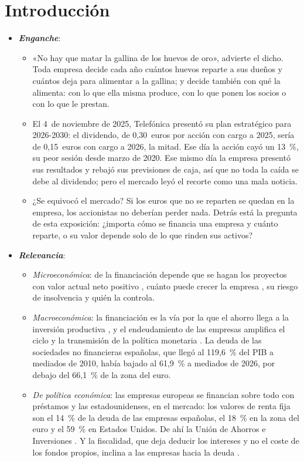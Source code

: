 \documentclass[11pt]{article}
\begin{document}
\tceetitulo

\section*{Introducción}

\begin{itemize}
\item \textbf{\emph{Enganche}}:
  \begin{itemize}
  \item «No hay que matar la gallina de los huevos de oro», advierte el dicho. Toda empresa decide cada año cuántos huevos reparte a sus dueños y cuántos deja para alimentar a la gallina; y decide también con qué la alimenta: con lo que ella misma produce, con lo que ponen los socios o con lo que le prestan.
  \item El 4~de noviembre de 2025, Telefónica presentó su plan estratégico para 2026-2030: el dividendo, de 0,30~euros por acción con cargo a 2025, sería de 0,15~euros con cargo a 2026, la mitad\nocite{Telefonica2025Plan}. Ese día la acción cayó un 13~\%, su peor sesión desde marzo de 2020\nocite{EuropaPress2025Telefonica}. Ese mismo día la empresa presentó sus resultados y rebajó sus previsiones de caja, así que no toda la caída se debe al dividendo; pero el mercado leyó el recorte como una mala noticia.
  \item ¿Se equivocó el mercado? Si los euros que no se reparten se quedan en la empresa, los accionistas no deberían perder nada. Detrás está la pregunta de esta exposición: ¿importa cómo se financia una empresa y cuánto reparte, o su valor depende solo de lo que rinden sus activos?
  \end{itemize}

\item \textbf{\emph{Relevancia}}:
  \begin{itemize}
  \item \emph{Microeconómica}: de la financiación depende que se hagan los proyectos con valor actual neto positivo , cuánto puede crecer la empresa , su riesgo de insolvencia y quién la controla.
  \item \emph{Macroeconómica}: la financiación es la vía por la que el ahorro llega a la inversión productiva , y el endeudamiento de las empresas amplifica el ciclo y la transmisión de la política monetaria . La deuda de las sociedades no financieras españolas, que llegó al 119,6~\% del PIB a mediados de 2010, había bajado al 61,9~\% a mediados de 2026, por debajo del 66,1~\% de la zona del euro\nocite{BCE2026QSA}.
  \item \emph{De política económica}: las empresas europeas se financian sobre todo con préstamos y las estadounidenses, en el mercado: los valores de renta fija son el 14~\% de la deuda de las empresas españolas, el 18~\% en la zona del euro y el 59~\% en Estados Unidos\nocite{BCE2026QSA,Fed2026Z1}. De ahí la Unión de Ahorros e Inversiones\nocite{CE2025UAI} . Y la fiscalidad, que deja deducir los intereses y no el coste de los fondos propios, inclina a las empresas hacia la deuda .
  \end{itemize}


\end{itemize}
\end{document}
